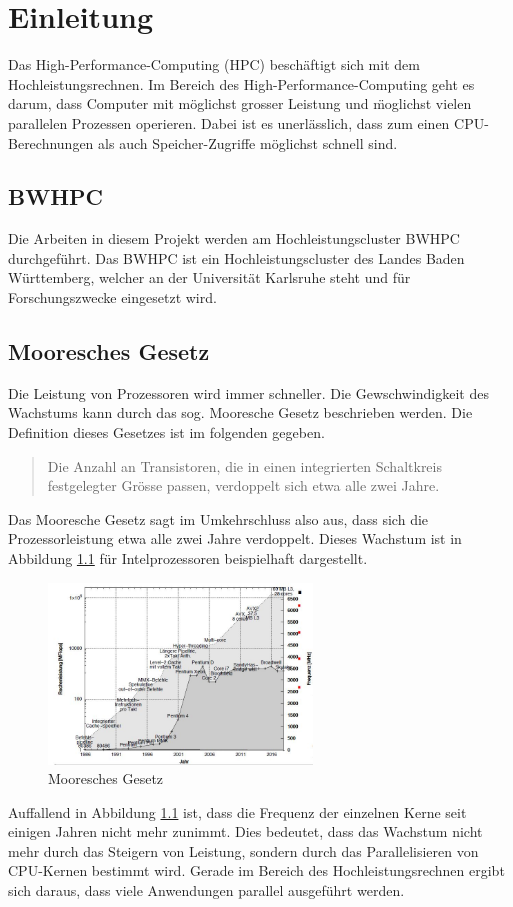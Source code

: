 \chapter{Einleitung}
\label{sec:einl}
Das High-Performance-Computing (HPC) besch\"aftigt sich mit dem Hochleistungsrechnen. Im Bereich des High-Performance-Computing geht es darum, dass Computer mit m\"oglichst grosser Leistung und \"moglichst vielen parallelen Prozessen operieren. Dabei ist es unerl\"asslich, dass zum einen CPU-Berechnungen als auch Speicher-Zugriffe m\"oglichst schnell sind.
\section{BWHPC}
Die Arbeiten in diesem Projekt werden am Hochleistungscluster BWHPC durchgef\"uhrt. Das BWHPC ist ein Hochleistungscluster des Landes Baden W\"urttemberg, welcher an der Universit\"at Karlsruhe steht und f\"ur Forschungszwecke eingesetzt wird.
\section{Mooresches Gesetz}
Die Leistung von Prozessoren wird immer schneller. Die Gewschwindigkeit des Wachstums kann durch das sog. Mooresche Gesetz beschrieben werden. Die Definition dieses Gesetzes ist im folgenden gegeben.

\begin{quote}Die Anzahl an Transistoren, die in einen integrierten Schaltkreis festgelegter Gr\"osse passen, verdoppelt sich etwa alle zwei Jahre.~\cite{Schanze.25.02.2016}\end{quote}
Das Mooresche Gesetz sagt im Umkehrschluss also aus, dass sich die Prozessorleistung etwa alle zwei Jahre verdoppelt. Dieses Wachstum ist in Abbildung \ref{fig:moore} f\"ur Intelprozessoren beispielhaft dargestellt.

\begin{figure}[h]
	\centering
	\includegraphics[width=7cm]{fig/moore.JPG}
	\caption{Mooresches Gesetz}
	\label{fig:moore}
\end{figure}
Auffallend in Abbildung \ref{fig:moore} ist, dass die Frequenz der einzelnen Kerne seit einigen Jahren nicht mehr zunimmt. Dies bedeutet, dass das Wachstum nicht mehr durch das Steigern von Leistung, sondern durch das Parallelisieren von CPU-Kernen bestimmt wird. Gerade im Bereich des Hochleistungsrechnen ergibt sich daraus, dass viele Anwendungen parallel ausgef\"uhrt werden.
